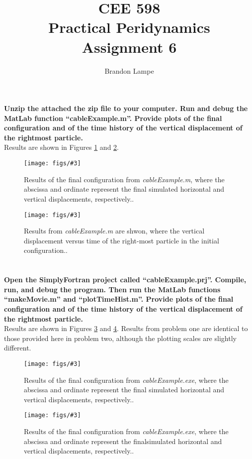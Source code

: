\documentclass[letterpaper, 10pt, oneside]{article}
\title{CEE 598\\ Practical Peridynamics\\ Assignment 6}
\author{Brandon Lampe}
\newenvironment{dd}[1]{
	\noindent
	\textbf{\normalsize{#1}}
	\hspace{0.1in}
	\small
	\rmfamily
	}
	{\medskip}
\newcommand{\bdd}{\begin{dd}}
\newcommand{\edd}{\end{dd}}
\newcommand{\Figure}[4]{
  \begin{figure}[#1]
    \centering
    \texttt{[image: figs/\#3]}
    \caption{#4.}\label{fig:#3}
  \end{figure}}
\begin{document}
\maketitle
\section{} 
\bdd{Unzip the attached the zip file to your computer. Run and debug the MatLab function “cableExample.m”. Provide plots of the final configuration and of the time history of the vertical displacement of the rightmost particle.}\\


Results are shown in Figures \ref{fig:1_1.pdf} and \ref{fig:1_2.pdf}.

\Figure{htp}{4}{1_1.pdf}{Results of the final configuration from \emph{cableExample.m}, where the abscissa and ordinate represent the final simulated horizontal and vertical displacements, respectively.}

\Figure{htp}{4}{1_2.pdf}{Results from \emph{cableExample.m} are shwon, where the vertical displacement versus time of the right-most particle in the initial configuration.}

\edd
\section{}
\bdd{Open the SimplyFortran project called “cableExample.prj”. Compile, run, and debug the program. Then run the MatLab functions “makeMovie.m” and “plotTimeHist.m”. Provide plots of the final configuration and of the time history of the vertical displacement of the rightmost particle.} \\

Results are shown in Figures \ref{fig:2_1.pdf} and \ref{fig:2_2.pdf}.  Results from problem one are identical to those provided here in problem two, although the plotting scales are slightly different.

\Figure{htp}{5}{2_1.pdf}{Results of the final configuration from \emph{cableExample.exe}, where the abscissa and ordinate represent the final simulated horizontal and vertical displacements, respectively.}


\Figure{htp}{5}{2_2.pdf}{Results of the final configuration from \emph{cableExample.exe}, where the abscissa and ordinate represent the finalsimulated horizontal and vertical displacements, respectively.}
\end{document}
